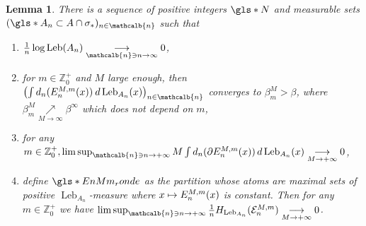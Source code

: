 \documentclass[JEP,XML,SOM,Unicode,NoFloatCountersInSection,published]{cedram}
\newenvironment{enumeratei}
{\bgroup\def\theenumi{\roman{enumi}}\def\theenumii{\arabic{enumii}}\begin{enumerate}}
{\end{enumerate}\egroup}
\newcommand\mto{\mathchoice{\longmapsto}{\mapsto}{\mapsto}{\mapsto}}
\DeclareMathOperator{\Leb}{Leb}
\newcommand{\mcbn}{{\mathcalb{n}}}
\newtheorem{lem}[thm]{Lemma}
\theoremstyle{definition}
\newcommand{\bbZ}{{\mathbb{Z}}}
\begin{document}
\begin{lem}
\label{lem:def-An}
There is a sequence of positive integers $\gls*{N}$ and measurable sets $(\gls*{A_n} \subset A \cap \sigma_*)_{n \in \mcbn}$ such that
\begin{enumeratei}
\item\label{lem:def-Ani}
 $\frac{1}{n}\log \Leb(A_n) \underset{\mcbn \ni n \to \infty}{\longrightarrow} 0$,
\item\label{lem:def-Anii}
 for $m \in \bbZ_0^+$ and $M$ large enough, then $\left (\int d_n(E_n^{M,m}(x)) \: d \Leb_{A_n}(x) \right)_{n \in \mcbn}$ converges to $\beta_m^M > \beta$, where $\beta_m^M \underset{M \to \infty}{\nearrow} \beta^{\infty}$ which does not depend on $m$,
\item\label{lem:def-Aniii}
 for any $m \in \bbZ_0^+, \limsup_{\mcbn \ni n \to +\infty} M \int d_n(\partial E_n^{M,m}(x))\, d \Leb_{A_n}(x) \underset{M \to +\infty}{\longrightarrow} 0$,
\item\label{lem:def-Aniv}
 define
$\gls*{EnMm_ronde}$ as the partition whose atoms are maximal sets of positive $\Leb_{A_n}$-measure where $x \mto E_n^{M,m}(x)$ is constant. Then for any $m \in \bbZ_0^+$ we have
$\limsup_{\mcbn \ni n \to +\infty}\frac{1}{n} H_{\Leb_{A_n}}(\mathcal{E}_n^{M,m})\underset{M \to +\infty}{\longrightarrow} 0$.
\end{enumeratei}
\end{lem}
\end{document}
